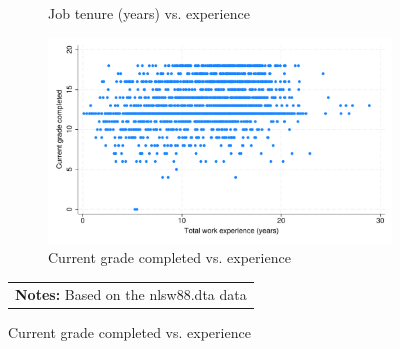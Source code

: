 \documentclass{article}
\begin{document}
\begin{figure}[H]
\begin{subfigure}{.45\textwidth}
  \caption{Job tenure (years) vs. experience}
\end{subfigure}
\begin{subfigure}{.45\textwidth}
  \includegraphics[width = 1.00\textwidth]{./figures/scatter_grade.pdf}  
  \caption{Current grade completed vs. experience}
\end{subfigure}
\begin{tabular}{p{6in}}  
 \footnotesize 
 \textbf{Notes:} Based on the nlsw88.dta data 
\end{tabular} 
\end{figure} 
\end{document}
